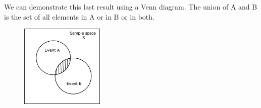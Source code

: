       \label{m39377*uid59}\nopagebreak\noindent{}
\label{m39377*eip-41}We can demonstrate this last result using a Venn diagram. The union of A and B is the set of all elements in A or in B or in both.
    \setcounter{subfigure}{0}
	\begin{figure}[H] %
    \begin{center}
    \label{m39377*uid743!!!underscore!!!media}\label{m39377*uid743!!!underscore!!!printimage}\includegraphics[width=150px]{col11306.imgs/m39377_venn1.png} %
      \vspace{2pt}
    \vspace{.1in}
    \end{center}
 \end{figure}       

